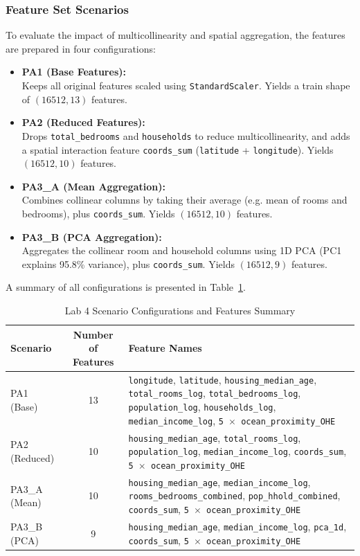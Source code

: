 \documentclass[12pt,a4paper]{article}
\begin{document}
\subsubsection{Feature Set Scenarios}
To evaluate the impact of multicollinearity and spatial aggregation, the features are prepared in four configurations:
\begin{itemize}
    \item \textbf{PA1 (Base Features):}\mbox{}\\ Keeps all original features scaled using \texttt{StandardScaler}. Yields a train shape of $(16512, 13)$ features.
    \item \textbf{PA2 (Reduced Features):}\mbox{}\\ Drops \texttt{total\_bedrooms} and \texttt{households} to reduce multicollinearity, and adds a spatial interaction feature \texttt{coords\_sum} (\texttt{latitude} + \texttt{longitude}). Yields $(16512, 10)$ features.
    \item \textbf{PA3\_A (Mean Aggregation):}\mbox{}\\ Combines collinear columns by taking their average (e.g. mean of rooms and bedrooms), plus \texttt{coords\_sum}. Yields $(16512, 10)$ features.
    \item \textbf{PA3\_B (PCA Aggregation):}\mbox{}\\ Aggregates the collinear room and household columns using 1D PCA (PC1 explains 95.8\% variance), plus \texttt{coords\_sum}. Yields $(16512, 9)$ features.
\end{itemize}

A summary of all configurations is presented in Table~\ref{tab:summary_fe_lab4}.
\begin{table}[H]
\centering
\caption{Lab 4 Scenario Configurations and Features Summary}
\label{tab:summary_fe_lab4}
\begin{tabular}{lcp{9.5cm}}
\toprule
\textbf{Scenario} & \textbf{Number of Features} & \textbf{Feature Names} \\
\midrule
PA1 (Base) & 13 & \texttt{longitude}, \texttt{latitude}, \texttt{housing\_median\_age}, \texttt{total\_rooms\_log}, \texttt{total\_bedrooms\_log}, \texttt{population\_log}, \texttt{households\_log}, \texttt{median\_income\_log}, \texttt{5 $\times$ ocean\_proximity\_OHE} \\
PA2 (Reduced) & 10 & \texttt{housing\_median\_age}, \texttt{total\_rooms\_log}, \texttt{population\_log}, \texttt{median\_income\_log}, \texttt{coords\_sum}, \texttt{5 $\times$ ocean\_proximity\_OHE} \\
PA3\_A (Mean) & 10 & \texttt{housing\_median\_age}, \texttt{median\_income\_log}, \texttt{rooms\_bedrooms\_combined}, \texttt{pop\_hhold\_combined}, \texttt{coords\_sum}, \texttt{5 $\times$ ocean\_proximity\_OHE} \\
PA3\_B (PCA) & 9 & \texttt{housing\_median\_age}, \texttt{median\_income\_log}, \texttt{pca\_1d}, \texttt{coords\_sum}, \texttt{5 $\times$ ocean\_proximity\_OHE} \\
\bottomrule
\end{tabular}
\end{table}
\end{document}
